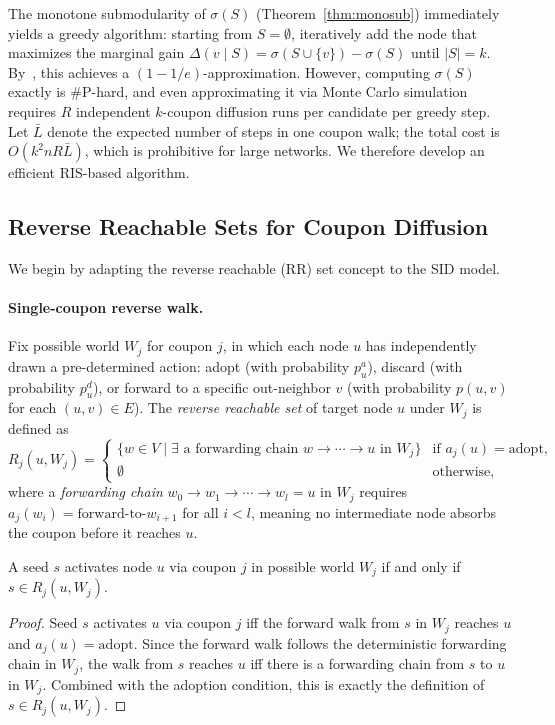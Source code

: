 \documentclass[sigconf]{acmart}
\begin{document}
The monotone submodularity of $\sigma(S)$ (Theorem~\ref{thm:monosub}) immediately yields a greedy algorithm: starting from $S = \emptyset$, iteratively add the node that maximizes the marginal gain $\Delta(v \mid S) = \sigma(S \cup \{v\}) - \sigma(S)$ until $|S| = k$. By~\cite{nemhauser1978analysis}, this achieves a $(1-1/e)$-approximation. However, computing $\sigma(S)$ exactly is \#P-hard, and even approximating it via Monte Carlo simulation requires $R$ independent $k$-coupon diffusion runs per candidate per greedy step. Let $\bar{L}$ denote the expected number of steps in one coupon walk; the total cost is $O(k^2 n R \bar{L})$, which is prohibitive for large networks. We therefore develop an efficient RIS-based algorithm.

\subsection{Reverse Reachable Sets for Coupon Diffusion}

We begin by adapting the reverse reachable (RR) set concept to the SID model.

\paragraph{Single-coupon reverse walk.}
Fix possible world $W_j$ for coupon $j$, in which each node $u$ has independently drawn a pre-determined action: adopt (with probability $p_u^a$), discard (with probability $p_u^d$), or forward to a specific out-neighbor $v$ (with probability $p(u,v)$ for each $(u,v)\in E$). The \emph{reverse reachable set} of target node $u$ under $W_j$ is defined as
\[
  R_j(u, W_j) =
  \begin{cases}
    \{w \in V \mid \exists\text{ a forwarding chain } w \to \cdots \to u \text{ in } W_j\} & \text{if } a_j(u) = \text{adopt}, \\
    \emptyset & \text{otherwise,}
  \end{cases}
\]
where a \emph{forwarding chain} $w_0 \to w_1 \to \cdots \to w_l = u$ in $W_j$ requires $a_j(w_i) = \text{forward-to-}w_{i+1}$ for all $i < l$, meaning no intermediate node absorbs the coupon before it reaches $u$.

\begin{lemma}
\label{lem:rr-coverage}
A seed $s$ activates node $u$ via coupon $j$ in possible world $W_j$ if and only if $s \in R_j(u, W_j)$.
\end{lemma}

\begin{proof}
Seed $s$ activates $u$ via coupon $j$ iff the forward walk from $s$ in $W_j$ reaches $u$ and $a_j(u) = \mathrm{adopt}$. Since the forward walk follows the deterministic forwarding chain in $W_j$, the walk from $s$ reaches $u$ iff there is a forwarding chain from $s$ to $u$ in $W_j$. Combined with the adoption condition, this is exactly the definition of $s \in R_j(u, W_j)$.
\end{proof}
\end{document}
